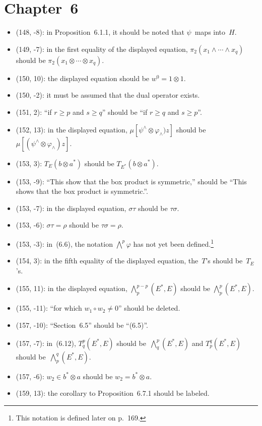 \documentclass[letterpaper,12pt]{article}
\newcommand{\after}{\circ}
\newcommand{\tprod}{\otimes}
\newcommand{\eprod}{\wedge}
\newcommand{\bigeprod}{\bigwedge}
\begin{document}
\section*{Chapter~6}
\begin{itemize}
\item (148, -8): in Proposition~6.1.1, it should be noted that \(\psi\)~maps into~\(H\).
\item (149, -7): in the first equality of the displayed equation, \(\pi_2(x_1\eprod\cdots\eprod x_q)\) should be \(\pi_2(x_1\tprod\cdots\tprod x_q)\).
\item (150, 10): the displayed equation should be \(w^0=1\tprod 1\).
\item (150, -2): it must be assumed that the dual operator exists.
\item (151, 2): ``if \(r\ge p\) and \(s\ge q\)'' should be ``if \(r\ge q\) and \(s\ge p\)''.
\item (152, 13): in the displayed equation, \(\mu[\psi^{\eprod}\tprod\varphi_{\eprod})z]\) should be \(\mu[(\psi^{\eprod}\tprod\varphi_{\eprod})z]\).
\item (153, 3): \(T_E(b\tprod a^*)\) should be \(T_{E^*}(b\tprod a^*)\).
\item (153, -9): ``This show that the box product is symmetric,'' should be ``This shows that the box product is symmetric.''.
\item (153, -7): in the displayed equation, \(\sigma\tau\) should be \(\tau\sigma\).
\item (153, -6): \(\sigma\tau=\rho\) should be \(\tau\sigma=\rho\).
\item (153, -3): in~(6.6), the notation \(\bigeprod^p\varphi\) has not yet been defined.\footnote{This notation is defined later on p.~169.}
\item (154, 3): in the fifth equality of the displayed equation, the~\(T\)'s should be~\(T_E\)'s.
\item (155, 11): in the displayed equation, \(\bigeprod^{p-p}_p(E^*,E)\) should be \(\bigeprod^p_p(E^*,E)\).
\item (155, -11): ``for which \(w_1\after w_2\ne 0\)'' should be deleted.
\item (157, -10): ``Section~6.5'' should be ``(6.5)''.
\item (157, -7): in~(6.12), \(T^p_q(E^*,E)\) should be~\(\bigeprod^p_q(E^*,E)\) and \(T^q_p(E^*,E)\) should be~\(\bigeprod^q_p(E^*,E)\).
\item (157, -6): \(w_2\in b^*\tprod a\) should be \(w_2=b^*\tprod a\).
\item (159, 13): the corollary to Proposition~6.7.1 should be labeled.

\end{itemize}
\end{document}
